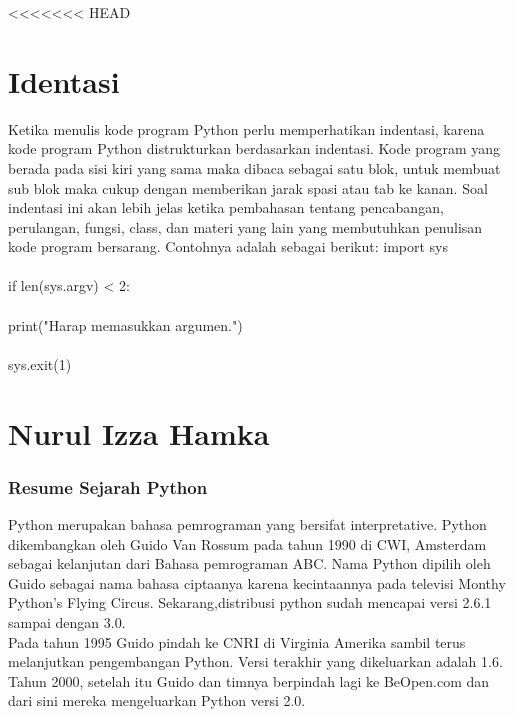 <<<<<<< HEAD
\section{Identasi}
Ketika menulis kode program Python perlu memperhatikan indentasi, karena kode program Python distrukturkan berdasarkan indentasi. Kode program yang berada pada sisi kiri yang sama maka dibaca sebagai satu blok, untuk membuat sub blok maka cukup dengan memberikan jarak spasi atau tab ke kanan.
Soal indentasi ini akan lebih jelas ketika pembahasan tentang pencabangan, perulangan, fungsi, class, dan materi yang lain yang membutuhkan penulisan kode program bersarang.
Contohnya adalah sebagai berikut:
import sys
\paragraph{}
if len(sys.argv) < 2:
\paragraph{}
    print("Harap memasukkan argumen.")
    \paragraph{}
    sys.exit(1)

\section{Nurul Izza Hamka} 
\subsubsection{Resume Sejarah Python}

Python merupakan bahasa pemrograman yang bersifat interpretative. Python dikembangkan oleh Guido Van Rossum pada tahun 1990 di CWI, Amsterdam sebagai kelanjutan dari Bahasa pemrograman ABC. Nama Python dipilih oleh Guido sebagai nama bahasa ciptaanya karena kecintaannya pada televisi Monthy Python’s Flying Circus. Sekarang,distribusi python sudah mencapai versi 2.6.1 sampai dengan 3.0.\\

Pada tahun 1995 Guido pindah ke CNRI di Virginia Amerika sambil terus melanjutkan pengembangan Python. Versi terakhir yang dikeluarkan adalah 1.6. Tahun 2000, setelah itu Guido dan timnya berpindah lagi ke BeOpen.com dan dari sini mereka mengeluarkan Python versi 2.0.\\


